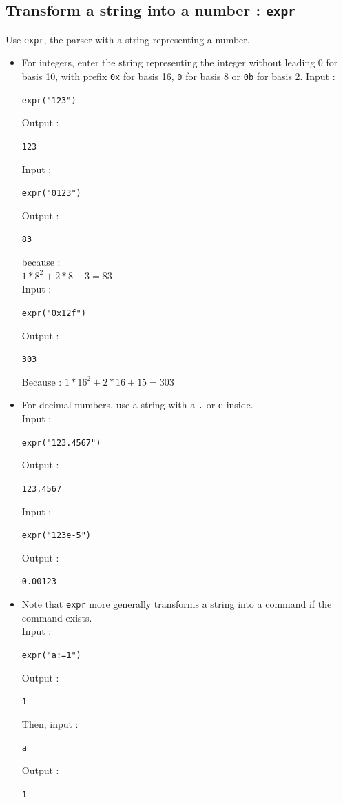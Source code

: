 \documentclass[a4paper,11pt]{book}
\begin{document}
\subsection{Transform a string into a number : {\tt expr}}\label{sec:expr1}
Use {\tt expr}, the parser with a string representing a number.
\begin{itemize}
\item For integers, enter the string representing the integer without
leading 0 for basis 10, with prefix {\tt 0x} for basis 16,
{\tt 0} for basis 8 or {\tt 0b} for basis 2.
Input :
\begin{center}{\tt expr("123")}\end{center}
Output :
\begin{center}{\tt  123}\end{center}
Input :
\begin{center}{\tt expr("0123")}\end{center}
Output :
\begin{center}{\tt  83}\end{center}
because :\\
$1*8^2+2*8+3=83$\\
Input :
\begin{center}{\tt expr("0x12f")}\end{center}
Output :
\begin{center}{\tt 303}\end{center}
Because : $1*16^2+2*16+15=303$
\item For decimal numbers, use a string with a {\tt .} or {\tt e} inside.\\
Input :
\begin{center}{\tt expr("123.4567")}\end{center}
Output :
\begin{center}{\tt  123.4567}\end{center}
Input :
\begin{center}{\tt expr("123e-5")}\end{center}
Output :
\begin{center}{\tt 0.00123}\end{center}
\item Note that {\tt expr} more generally transforms a string 
into a command if the command exists.\\
Input :
\begin{center}{\tt expr("a:=1")}\end{center}
Output :
\begin{center}{\tt 1}\end{center}
Then, input :
\begin{center}{\tt a}\end{center}
Output :
\begin{center}{\tt 1}\end{center}
\end{itemize}
\end{document}
